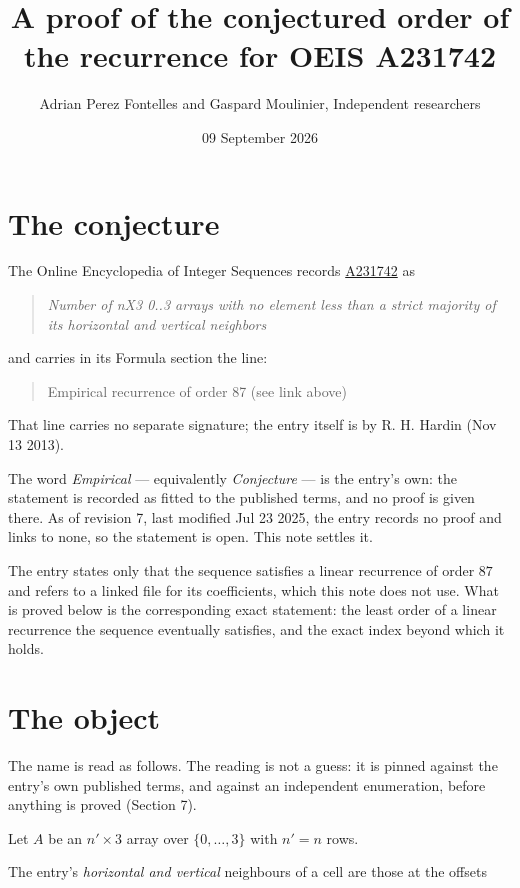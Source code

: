 \documentclass[11pt]{article}
\title{A proof of the conjectured order of the recurrence for OEIS A231742}
\author{Adrian Perez Fontelles and Gaspard Moulinier, Independent researchers}
\date{09 September 2026}
\theoremstyle{definition}
\begin{document}
\maketitle
\section{The conjecture}

The Online Encyclopedia of Integer Sequences records \href{https://oeis.org/A231742}{A231742} as

\begin{quote}\itshape Number of nX3 0..3 arrays with no element less than a strict majority of its horizontal and vertical neighbors\end{quote}

and carries in its Formula section the line:

\begin{quote}\ttfamily Empirical recurrence of order 87 (see link above)\end{quote}

That line carries no separate signature; the entry itself is by R. H. Hardin (Nov 13 2013).

The word {\itshape Empirical} --- equivalently {\itshape Conjecture} --- is the entry's own: the statement is recorded as fitted to the published terms, and no proof is given there. As of revision 7, last modified Jul 23 2025, the entry records no proof and links to none, so the statement is open. This note settles it.

The entry states only that the sequence satisfies a linear recurrence of order $87$ and refers to a linked file for its coefficients, which this note does not use. What is proved below is the corresponding exact statement: the least order of a linear recurrence the sequence eventually satisfies, and the exact index beyond which it holds.

\section{The object}

The name is read as follows. The reading is not a guess: it is pinned against the entry's own published terms, and against an independent enumeration, before anything is proved (Section 7).

Let $A$ be an $n' \times 3$ array over $\{0,\dots,3\}$ with $n' = n$ rows.

The entry's {\itshape horizontal and vertical} neighbours of a cell are those at the offsets
\end{document}
